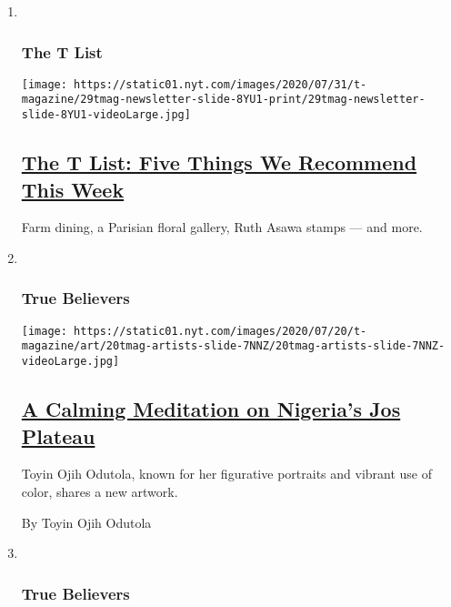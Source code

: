 \begin{enumerate}
\def\labelenumi{\arabic{enumi}.}
\item ~
  \hypertarget{the-t-list}{%
  \subsubsection{The T List}\label{the-t-list}}

  \texttt{[image: https://static01.nyt.com/images/2020/07/31/t-magazine/29tmag-newsletter-slide-8YU1-print/29tmag-newsletter-slide-8YU1-videoLarge.jpg]}

  \hypertarget{the-t-list-five-things-we-recommend-this-week}{%
  \subsection{\texorpdfstring{\href{/2020/07/30/t-magazine/the-t-list-five-things-we-recommend-this-week.html}{The
  T List: Five Things We Recommend This
  Week}}{The T List: Five Things We Recommend This Week}}\label{the-t-list-five-things-we-recommend-this-week}}

  Farm dining, a Parisian floral gallery, Ruth Asawa stamps --- and
  more.
\item ~
  \hypertarget{true-believers}{%
  \subsubsection{True Believers}\label{true-believers}}

  \texttt{[image: https://static01.nyt.com/images/2020/07/20/t-magazine/art/20tmag-artists-slide-7NNZ/20tmag-artists-slide-7NNZ-videoLarge.jpg]}

  \hypertarget{a-calming-meditation-on-nigerias-jos-plateau}{%
  \subsection{\texorpdfstring{\href{/2020/07/22/t-magazine/toyin-ojih-odutola.html}{A
  Calming Meditation on Nigeria's Jos
  Plateau}}{A Calming Meditation on Nigeria's Jos Plateau}}\label{a-calming-meditation-on-nigerias-jos-plateau}}

  Toyin Ojih Odutola, known for her figurative portraits and vibrant use
  of color, shares a new artwork.

  By Toyin Ojih Odutola
\item ~
  \hypertarget{true-believers-1}{%
  \subsubsection{True Believers}\label{true-believers-1}}


\end{enumerate}
